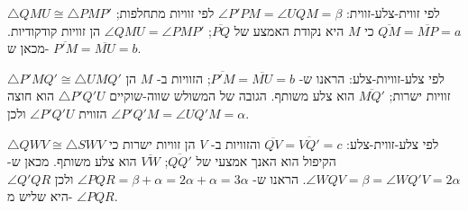 $\triangle QMU\cong \triangle PMP'$
לפי זווית-צלע-זווית:
$\angle P'PM=\angle UQM=\beta$
לפי זוויות מתחלפות;
$\overline{QM}=\overline{MP}=a$
כי 
$M$
היא נקודת האמצע של
$\overline{PQ}$;
$\angle QMU=\angle PMP'$
הן זוויות קודקודיות. מכאן ש-%
$\overline{P'M}=\overline{MU}=b$.

$\triangle P'MQ'\cong\triangle UMQ'$
לפי צלע-זוויות-צלע: הראנו ש-%
$\overline{P'M}=\overline{MU}=b$;
הזוויות ב-%
$M$
הן זוויות ישרות; 
$\overline{MQ'}$
הוא צלע משותף. הגובה של המשולש שווה-שוקיים 
$\triangle P'Q'U$ 
הוא חוצה הזווית
$\angle P'Q'U$
ולכן
$\angle P'Q'M=\angle UQ'M=\alpha$.


$\triangle QWV\cong\triangle SWV$
לפי צלע-זווית-צלע:
$\overline{QV}=\overline{VQ'}=c$
והזוויות ב-%
$V$
הן זוויות ישרות כי הקיפול הוא האנך אמצעי של
$\overline{QQ'}$; $\overline{VW}$
הוא צלע משותף. מכאן ש-%
$\angle WQV=\beta=\angle WQ'V=2\alpha$.
הראנו ש-%
$\angle PQR = \beta + \alpha = 2\alpha+\alpha=3\alpha$
ולכן
$\angle Q'QR$
היא שליש מ-%
$\angle PQR$.
